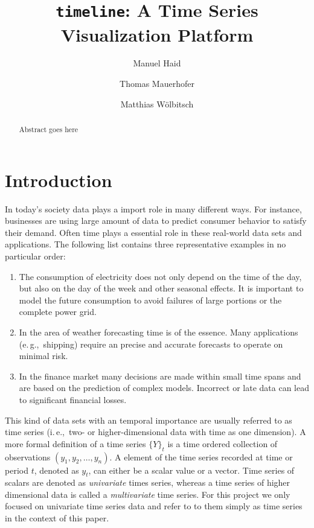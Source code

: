 \documentclass[runningheads,a4paper]{llncs}
\newcommand{\eg}{e.\,g.,\ }
\newcommand{\ie}{i.\,e.,\ }
\begin{document}


\title{\texttt{timeline}: A Time Series Visualization Platform}
\author{Manuel Haid \and Thomas Mauerhofer \and Matthias W\"olbitsch}

\maketitle

\begin{abstract}
Abstract goes here
\end{abstract}


\section{Introduction}\label{sec:intro}

In today's society data plays a import role in many different ways.
For instance, businesses are using large amount of data to predict consumer behavior to satisfy their demand.
Often time plays a essential role in these real-world data sets and applications. 
The following list contains three representative examples in no particular order:

\begin{enumerate}
 \item The consumption of electricity does not only depend on the time of the day, but also on the day of the week and other seasonal effects.
 It is important to model the future consumption to avoid failures of large portions or the complete power grid.
 \item In the area of weather forecasting time is of the essence. 
 Many applications (\eg shipping) require an precise and accurate forecasts to operate on minimal risk.
 \item In the finance market many decisions are made within small time spans and are based on the prediction of complex models.
 Incorrect or late data can lead to significant financial losses.
\end{enumerate}


This kind of data sets with an temporal importance are usually referred to as time series (\ie two- or higher-dimensional data with time as one dimension). 
A more formal definition \cite{Cortez2012} of a time series \(\{Y\}_t\) is a time ordered collection of observations \((y_1, y_2, \ldots, y_n)\).
A element of the time series recorded at time or period \(t\), denoted as \(y_t\), can either be a scalar value or a vector.
Time series of scalars are denoted as \emph{univariate} times series, whereas a time series of higher dimensional data is called a \emph{multivariate} time series.
For this project we only focused on univariate time series data and refer to to them simply as time series in the context of this paper.
\end{document}
